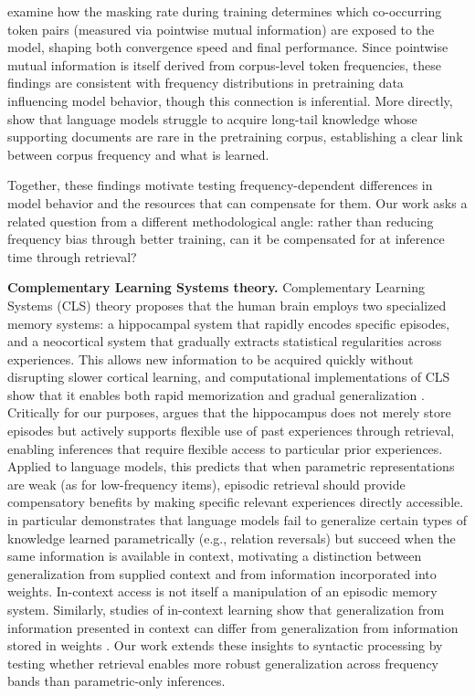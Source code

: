 \citet{wettig-etal-2023-mask} examine how the masking rate during training determines which co-occurring token pairs (measured via pointwise mutual information) are exposed to the model, shaping both convergence speed and final performance. Since pointwise mutual information is itself derived from corpus-level token frequencies, these findings are consistent with frequency distributions in pretraining data influencing model behavior, though this connection is inferential. More directly, \citet{kandpal2023large} show that language models struggle to acquire long-tail knowledge whose supporting documents are rare in the pretraining corpus, establishing a clear link between corpus frequency and what is learned.

Together, these findings motivate testing frequency-dependent differences in model behavior and the resources that can compensate for them. Our work asks a related question from a different methodological angle: rather than reducing frequency bias through better training, can it be compensated for at inference time through retrieval?

\noindent \textbf{Complementary Learning Systems theory.}
Complementary Learning Systems (CLS) theory \citep{mcclelland1995there, kumaran2016learning} proposes that the human brain employs two specialized memory systems: a hippocampal system that rapidly encodes specific episodes, and a neocortical system that gradually extracts statistical regularities across experiences. This allows new information to be acquired quickly without disrupting slower cortical learning, and computational implementations of CLS show that it enables both rapid memorization and gradual generalization \citep{mcclelland1995there}. Critically for our purposes, \citet{eichenbaum2001hippocampus} argues that the hippocampus does not merely store episodes but actively supports flexible use of past experiences through retrieval, enabling inferences that require flexible access to particular prior experiences. Applied to language models, this predicts that when parametric representations are weak (as for low-frequency items), episodic retrieval should provide compensatory benefits by making specific relevant experiences directly accessible.  \citet{lampinen2025latent} in particular demonstrates that language models fail to generalize certain types of knowledge learned parametrically (e.g., relation reversals) but succeed when the same information is available in context, motivating a distinction between generalization from supplied context and from information incorporated into weights. In-context access is not itself a manipulation of an episodic memory system. Similarly, studies of in-context learning show that generalization from information presented in context can differ from generalization from information stored in weights \citep{chan2022transformers}. Our work extends these insights to syntactic processing by testing whether retrieval enables more robust generalization across frequency bands than parametric-only inferences.

